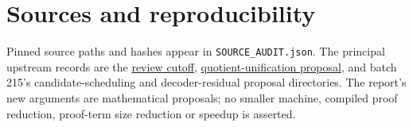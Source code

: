 \documentclass[10pt]{article}
\newcommand{\code}[1]{\texttt{#1}}
\begin{document}
\section*{Sources and reproducibility}
Pinned source paths and hashes appear in \code{SOURCE\_AUDIT.json}. The principal upstream records are the \href{https://github.com/VladimirReshetnikov/ProveIt/commit/6d9800d1ca67c52db0eb6e1c65df7b5cab9cdb95}{review cutoff}, \href{https://github.com/VladimirReshetnikov/ProveIt/commit/eb931b07ad8de83ba1a1d21dc84abe5a1c98364e}{quotient-unification proposal}, and batch 215's candidate-scheduling and decoder-residual proposal directories. The report's new arguments are mathematical proposals; no smaller machine, compiled proof reduction, proof-term size reduction or speedup is asserted.
\end{document}
